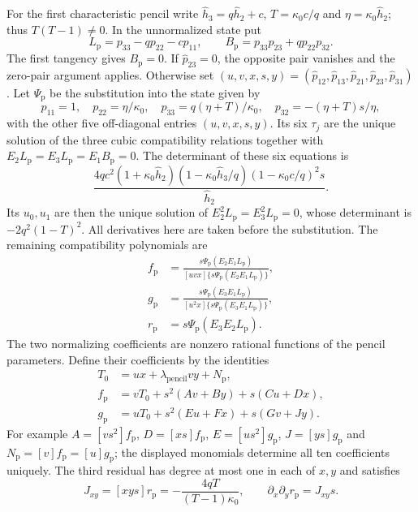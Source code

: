 \documentclass[11pt,a4paper]{article}
\numberwithin{equation}{section}
\theoremstyle{plain}
\theoremstyle{definition}
\theoremstyle{remark}
\begin{document}
For the first characteristic pencil write $\widehat h_3=q\widehat h_2+c$,
$T=\kappa_0c/q$ and $\eta=\kappa_0\widehat h_2$; thus $T(T-1)\ne0$.
In the unnormalized state put
\[
 L_{\mathrm p}=p_{33}-qp_{22}-cp_{11},\qquad
 B_{\mathrm p}=p_{33}p_{23}+qp_{22}p_{32}.
\]
The first tangency gives $B_{\mathrm p}=0$. If $\widehat p_{23}=0$,
the opposite pair vanishes and the zero-pair argument applies. Otherwise set
$(u,v,x,s,y)=(\widehat p_{12},\widehat p_{13},\widehat p_{21},
\widehat p_{23},\widehat p_{31})$. Let $\Psi_{\mathrm p}$ be the substitution
into the state given by
\[
 p_{11}=1,\quad p_{22}=\eta/\kappa_0,\quad
 p_{33}=q(\eta+T)/\kappa_0,\quad
 p_{32}=-(\eta+T)s/\eta,
\]
with the other five off-diagonal entries $(u,v,x,s,y)$.
Its six $\tau_j$ are the unique solution of the three cubic compatibility
relations together with $E_2L_{\mathrm p}=E_3L_{\mathrm p}=E_1B_{\mathrm p}=0$.
The determinant of these six equations is
\[
 \frac{4qc^2(1+\kappa_0\widehat h_2)
 (1-\kappa_0\widehat h_3/q)(1-\kappa_0c/q)^2s}{\widehat h_2}.
\]
Its $u_0,u_1$ are then the unique solution of
$E_2^2L_{\mathrm p}=E_3^2L_{\mathrm p}=0$, whose determinant is
$-2q^2(1-T)^2$. All derivatives here are taken before the substitution.
The remaining compatibility polynomials are
\[
 \begin{aligned}
 f_{\mathrm p}&=\frac{s\Psi_{\mathrm p}(E_2E_1L_{\mathrm p})}
 {[uvx]\{s\Psi_{\mathrm p}(E_2E_1L_{\mathrm p})\}},\\
 g_{\mathrm p}&=\frac{s\Psi_{\mathrm p}(E_3E_1L_{\mathrm p})}
 {[u^2x]\{s\Psi_{\mathrm p}(E_3E_1L_{\mathrm p})\}},\\
 r_{\mathrm p}&=s\Psi_{\mathrm p}(E_3E_2L_{\mathrm p}).
 \end{aligned}
\]
The two normalizing coefficients are nonzero rational functions of the
pencil parameters. Define their coefficients by the identities
\[
 \begin{aligned}
 T_0&=ux+\lambda_{\mathrm{pencil}} vy+N_{\mathrm p},\\
 f_{\mathrm p}&=vT_0+s^2(Av+By)+s(Cu+Dx),\\
 g_{\mathrm p}&=uT_0+s^2(Eu+Fx)+s(Gv+Jy).
 \end{aligned}
\]
For example $A=[vs^2]f_{\mathrm p}$, $D=[xs]f_{\mathrm p}$,
$E=[us^2]g_{\mathrm p}$, $J=[ys]g_{\mathrm p}$ and
$N_{\mathrm p}=[v]f_{\mathrm p}=[u]g_{\mathrm p}$; the displayed
monomials determine all ten coefficients uniquely. The third residual
has degree at most one in each of $x,y$ and satisfies
\[
 J_{xy}=[xys]r_{\mathrm p}=-\frac{4qT}{(T-1)\kappa_0},\qquad
 \partial_x\partial_y r_{\mathrm p}=J_{xy}s.
\]
\end{document}
